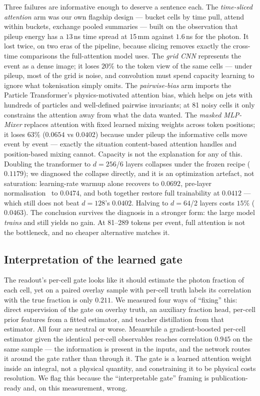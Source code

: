 \documentclass[11pt,a4paper]{article}
\begin{document}
Three failures are informative enough to deserve a sentence each. The
\emph{time-sliced attention} arm was our own flagship design --- bucket
cells by time pull, attend within buckets, exchange pooled summaries ---
built on the observation that pileup energy has a $13$\,ns time spread at
15\,mm against $1.6$\,ns for the photon. It lost twice, on two eras of the
pipeline, because slicing removes exactly the cross-time comparisons the
full-attention model uses. The \emph{grid CNN} represents the event as a
dense image; it loses $20\%$ to the token view of the same cells --- under
pileup, most of the grid is noise, and convolution must spend capacity
learning to ignore what tokenisation simply omits. The
\emph{pairwise-bias} arm imports the Particle Transformer's
physics-motivated attention bias, which helps on jets with hundreds of
particles and well-defined pairwise invariants; at 81 noisy cells it only
constrains the attention away from what the data wanted. The \emph{masked
MLP-Mixer} replaces attention with fixed learned mixing weights across
token positions; it loses $63\%$ ($0.0654$ vs $0.0402$) because under
pileup the informative cells move event by event --- exactly the situation
content-based attention handles and position-based mixing cannot. Capacity
is not the explanation for any of this. Doubling the transformer to
$d{=}256$/6 layers collapses under the frozen recipe ($0.1179$); we
diagnosed the collapse directly, and it is an optimization artefact, not
saturation: learning-rate warmup alone recovers to $0.0692$, pre-layer
normalisation~\cite{preln} to $0.0474$, and both together restore full
trainability at $0.0412$ --- which still does not beat $d{=}128$'s
$0.0402$. Halving to $d{=}64$/2 layers costs $15\%$ ($0.0463$). The
conclusion survives the diagnosis in a stronger form: the large model
\emph{trains} and still yields no gain. At 81--289 tokens per event, full
attention is not the bottleneck, and no cheaper alternative matches it.

\subsection{Interpretation of the learned gate}
\label{sec:gate}

The readout's per-cell gate looks like it should estimate the photon
fraction of each cell, yet on a paired overlay sample with per-cell truth
labels its correlation with the true fraction is only $0.211$. We measured
four ways of ``fixing'' this: direct supervision of the gate on overlay
truth, an auxiliary fraction head, per-cell prior features from a fitted
estimator, and teacher distillation from that estimator. All four are
neutral or worse. Meanwhile a gradient-boosted per-cell estimator given the
identical per-cell observables reaches correlation $0.945$ on the same
sample --- the information is present in the inputs, and the network routes
it around the gate rather than through it. The gate is a learned attention
weight inside an integral, not a physical quantity, and constraining it to
be physical costs resolution. We flag this because the ``interpretable
gate'' framing is publication-ready and, on this measurement, wrong.
\end{document}
